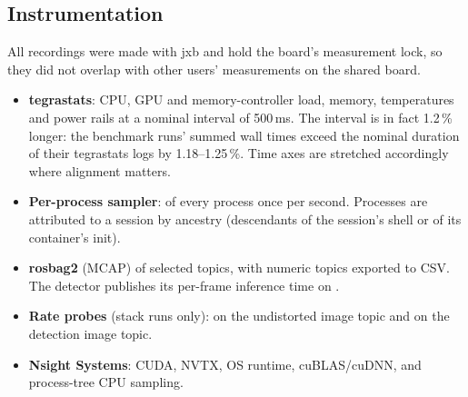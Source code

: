 \documentclass[11pt,a4paper]{article}
\newcommand{\jxb}{\textsf{jxb}}
\begin{document}
\subsection{Instrumentation}
All recordings were made with \jxb{} and hold the board's measurement lock, so they did not overlap with other users'
measurements on the shared board.
\begin{itemize}
  \item \textbf{tegrastats}: CPU, GPU and memory-controller load, memory, temperatures and power rails at a nominal
        interval of 500\,ms. The interval is in fact 1.2\,\% longer: the benchmark runs' summed wall times exceed the
        nominal duration of their tegrastats logs by 1.18--1.25\,\%. Time axes are stretched accordingly where
        alignment matters.
  \item \textbf{Per-process sampler}:  of every process once per second. Processes are
        attributed to a session by ancestry (descendants of the session's shell or of its container's init).
  \item \textbf{rosbag2} (MCAP) of selected topics, with numeric topics exported to CSV. The detector publishes
        its per-frame inference time on .
  \item \textbf{Rate probes} (stack runs only):  on the undistorted image topic and on the
        detection image topic.
  \item \textbf{Nsight Systems}: CUDA, NVTX, OS runtime, cuBLAS/cuDNN, and process-tree CPU sampling.
\end{itemize}
\end{document}
